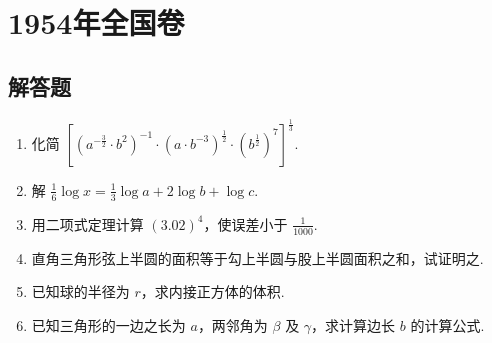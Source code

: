 \documentclass[UTF8,a4paper,oneside,11pt]{ctexbook}
\begin{document}
\mainmatter

\chapter{1954年全国卷}

\section{解答题}

\begin{problem}
\begin{enumerate}
\item 化简 \(\left[\left(a^{-\frac{3}{2}}\cdot b^{2}\right)^{-1}\cdot\left(a\cdot b^{-3}\right)^{\frac{1}{2}}\cdot\left(b^{\frac{1}{2}}\right)^{7}\right]^{\frac{1}{3}}\).
\item 解 \(\frac{1}{6}\log x=\frac{1}{3}\log a+2\log b+\log c\).
\item 用二项式定理计算 \(\left(3.02\right)^{4}\)，使误差小于 \(\frac{1}{1000}\).
\item 直角三角形弦上半圆的面积等于勾上半圆与股上半圆面积之和，试证明之.
\item 已知球的半径为 \(r\)，求内接正方体的体积.
\item 已知三角形的一边之长为 \(a\)，两邻角为 \(\beta\) 及 \(\gamma\)，求计算边长 \(b\) 的计算公式.
\end{enumerate}
\end{problem}
\end{document}
